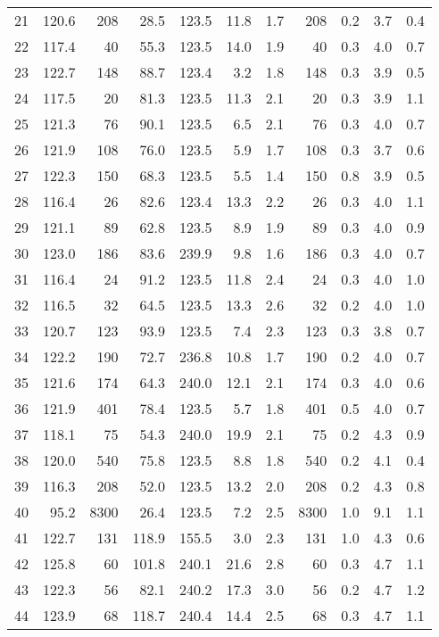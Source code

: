 \begin{tabular}{|r|rrrrr|rrrrr|}
21 & 120.6 & 208 & 28.5 & 123.5 & 11.8 & 1.7 & 208 & 0.2 & 3.7 & 0.4 \\
22 & 117.4 & 40 & 55.3 & 123.5 & 14.0 & 1.9 & 40 & 0.3 & 4.0 & 0.7 \\
23 & 122.7 & 148 & 88.7 & 123.4 & 3.2 & 1.8 & 148 & 0.3 & 3.9 & 0.5 \\
24 & 117.5 & 20 & 81.3 & 123.5 & 11.3 & 2.1 & 20 & 0.3 & 3.9 & 1.1 \\
25 & 121.3 & 76 & 90.1 & 123.5 & 6.5 & 2.1 & 76 & 0.3 & 4.0 & 0.7 \\
26 & 121.9 & 108 & 76.0 & 123.5 & 5.9 & 1.7 & 108 & 0.3 & 3.7 & 0.6 \\
27 & 122.3 & 150 & 68.3 & 123.5 & 5.5 & 1.4 & 150 & 0.8 & 3.9 & 0.5 \\
28 & 116.4 & 26 & 82.6 & 123.4 & 13.3 & 2.2 & 26 & 0.3 & 4.0 & 1.1 \\
29 & 121.1 & 89 & 62.8 & 123.5 & 8.9 & 1.9 & 89 & 0.3 & 4.0 & 0.9 \\
30 & 123.0 & 186 & 83.6 & 239.9 & 9.8 & 1.6 & 186 & 0.3 & 4.0 & 0.7 \\
31 & 116.4 & 24 & 91.2 & 123.5 & 11.8 & 2.4 & 24 & 0.3 & 4.0 & 1.0 \\
32 & 116.5 & 32 & 64.5 & 123.5 & 13.3 & 2.6 & 32 & 0.2 & 4.0 & 1.0 \\
33 & 120.7 & 123 & 93.9 & 123.5 & 7.4 & 2.3 & 123 & 0.3 & 3.8 & 0.7 \\
34 & 122.2 & 190 & 72.7 & 236.8 & 10.8 & 1.7 & 190 & 0.2 & 4.0 & 0.7 \\
35 & 121.6 & 174 & 64.3 & 240.0 & 12.1 & 2.1 & 174 & 0.3 & 4.0 & 0.6 \\
36 & 121.9 & 401 & 78.4 & 123.5 & 5.7 & 1.8 & 401 & 0.5 & 4.0 & 0.7 \\
37 & 118.1 & 75 & 54.3 & 240.0 & 19.9 & 2.1 & 75 & 0.2 & 4.3 & 0.9 \\
38 & 120.0 & 540 & 75.8 & 123.5 & 8.8 & 1.8 & 540 & 0.2 & 4.1 & 0.4 \\
39 & 116.3 & 208 & 52.0 & 123.5 & 13.2 & 2.0 & 208 & 0.2 & 4.3 & 0.8 \\
40 & 95.2 & 8300 & 26.4 & 123.5 & 7.2 & 2.5 & 8300 & 1.0 & 9.1 & 1.1 \\
41 & 122.7 & 131 & 118.9 & 155.5 & 3.0 & 2.3 & 131 & 1.0 & 4.3 & 0.6 \\
42 & 125.8 & 60 & 101.8 & 240.1 & 21.6 & 2.8 & 60 & 0.3 & 4.7 & 1.1 \\
43 & 122.3 & 56 & 82.1 & 240.2 & 17.3 & 3.0 & 56 & 0.2 & 4.7 & 1.2 \\
44 & 123.9 & 68 & 118.7 & 240.4 & 14.4 & 2.5 & 68 & 0.3 & 4.7 & 1.1 \\

\end{tabular}
